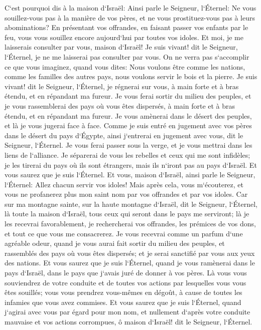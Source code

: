 \verse C`est pourquoi dis à la maison d`Israël: Ainsi parle le Seigneur, l`Éternel: Ne vous souillez-vous pas à la manière de vos pères, et ne vous prostituez-vous pas à leurs abominations? 
\verse En présentant vos offrandes, en faisant passer vos enfants par le feu, vous vous souillez encore aujourd`hui par toutes vos idoles. Et moi, je me laisserais consulter par vous, maison d`Israël! Je suis vivant! dit le Seigneur, l`Éternel, je ne me laisserai pas consulter par vous. 
\verse On ne verra pas s`accomplir ce que vous imaginez, quand vous dites: Nous voulons être comme les nations, comme les familles des autres pays, nous voulons servir le bois et la pierre. 
\verse Je suis vivant! dit le Seigneur, l`Éternel, je régnerai sur vous, à main forte et à bras étendu, et en répandant ma fureur. 
\verse Je vous ferai sortir du milieu des peuples, et je vous rassemblerai des pays où vous êtes dispersés, à main forte et à bras étendu, et en répandant ma fureur. 
\verse Je vous amènerai dans le désert des peuples, et là je vous jugerai face à face. 
\verse Comme je suis entré en jugement avec vos pères dans le désert du pays d`Égypte, ainsi j`entrerai en jugement avec vous, dit le Seigneur, l`Éternel. 
\verse Je vous ferai passer sous la verge, et je vous mettrai dans les liens de l`alliance. 
\verse Je séparerai de vous les rebelles et ceux qui me sont infidèles; je les tirerai du pays où ils sont étrangers, mais ils n`iront pas au pays d`Israël. Et vous saurez que je suis l`Éternel. 
\verse Et vous, maison d`Israël, ainsi parle le Seigneur, l`Éternel: Allez chacun servir vos idoles! Mais après cela, vous m`écouterez, et vous ne profanerez plus mon saint nom par vos offrandes et par vos idoles. 
\verse Car sur ma montagne sainte, sur la haute montagne d`Israël, dit le Seigneur, l`Éternel, là toute la maison d`Israël, tous ceux qui seront dans le pays me serviront; là je les recevrai favorablement, je rechercherai vos offrandes, les prémices de vos dons, et tout ce que vous me consacrerez. 
\verse Je vous recevrai comme un parfum d`une agréable odeur, quand je vous aurai fait sortir du milieu des peuples, et rassemblés des pays où vous êtes dispersés; et je serai sanctifié par vous aux yeux des nations. 
\verse Et vous saurez que je suis l`Éternel, quand je vous ramènerai dans le pays d`Israël, dans le pays que j`avais juré de donner à vos pères. 
\verse Là vous vous souviendrez de votre conduite et de toutes vos actions par lesquelles vous vous êtes souillés; vous vous prendrez vous-mêmes en dégoût, à cause de toutes les infamies que vous avez commises. 
\verse Et vous saurez que je suis l`Éternel, quand j`agirai avec vous par égard pour mon nom, et nullement d`après votre conduite mauvaise et vos actions corrompues, ô maison d`Israël! dit le Seigneur, l`Éternel. 

